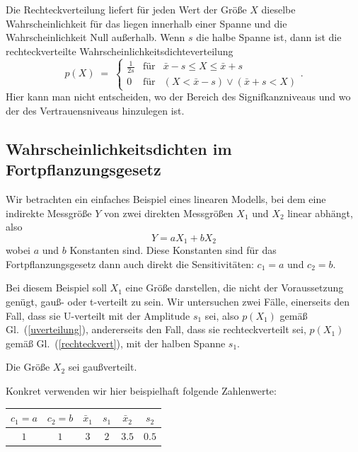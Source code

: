Die Rechteckverteilung liefert für jeden Wert der Größe $X$ dieselbe Wahrscheinlichkeit für
das liegen innerhalb einer Spanne und die Wahrscheinlichkeit Null außerhalb.
Wenn $s$ die halbe Spanne ist, dann ist die rechteckverteilte Wahrscheinlichkeitsdichteverteilung
\begin{equation}
p(X) \; = \; \left\{\begin{array}{lll}
\frac{1}{2 s} & \text{für} & \bar x - s  \leq X \leq \bar x + s\\
0 & \text{für} &  (X < \bar x - s) \vee (\bar x + s < X)
\end{array}\right. .
\label{rechteckvert}
\end{equation}
Hier kann man nicht entscheiden, wo der Bereich des Signifkanzniveaus und wo der des
Vertrauensniveaus hinzulegen ist.

\subsection{Wahrscheinlichkeitsdichten im Fortpflanzungsgesetz}
Wir betrachten ein einfaches Beispiel eines linearen Modells, bei dem eine
indirekte Messgröße $Y$ von zwei direkten Messgrößen $X_1$ und $X_2$ linear abhängt, also
\begin{equation}
Y = a X_1 + b X_2
\end{equation}
wobei $a$ und $b$ Konstanten sind. Diese Konstanten sind für das Fortpflanzungsgesetz
dann auch direkt die Sensitivitäten: $c_1 = a$ und $c_2 = b$.

Bei diesem Beispiel soll $X_1$ eine Größe darstellen, die nicht der Voraussetzung genügt, gauß- oder
t-verteilt zu sein. Wir untersuchen zwei Fälle, einerseits den Fall, dass sie U-verteilt mit
der Amplitude $s_1$ sei, also $p(X_1)$ gemäß Gl.~(\ref{uverteilung}), andererseits den Fall, 
dass sie rechteckverteilt sei, $p(X_1)$ gemäß Gl.~(\ref{rechteckvert}), mit der halben Spanne $s_1$.

Die Größe $X_2$ sei gaußverteilt.

Konkret verwenden wir hier beispielhaft folgende Zahlenwerte:
\begin{center}
	\begin{tabular}{c|c||c|c||c|c}
		$c_1 = a$ & $c_2 = b$ & $\bar x_1$ & $s_1$ & $\bar x_2$ & $s_2$ \\
		\hline
		$1$ & $1$ & $3$ & $2$ & $3.5$ & $0.5$
	\end{tabular}
\end{center}

